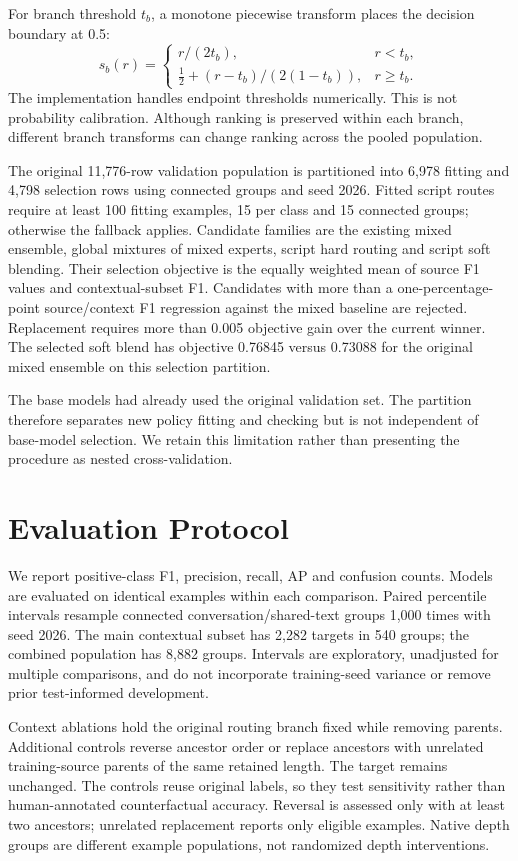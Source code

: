 \documentclass[11pt,a4paper]{article}
\begin{document}
For branch threshold $t_b$, a monotone piecewise transform places the decision boundary at 0.5:
\begin{equation}
s_b(r)=\begin{cases}r/(2t_b),&r<t_b,\\
\tfrac12+(r-t_b)/(2(1-t_b)),&r\geq t_b.
\end{cases}
\end{equation}
The implementation handles endpoint thresholds numerically. This is not probability calibration. Although ranking is preserved within each branch, different branch transforms can change ranking across the pooled population.

The original 11,776-row validation population is partitioned into 6,978 fitting and 4,798 selection rows using connected groups and seed 2026. Fitted script routes require at least 100 fitting examples, 15 per class and 15 connected groups; otherwise the fallback applies. Candidate families are the existing mixed ensemble, global mixtures of mixed experts, script hard routing and script soft blending. Their selection objective is the equally weighted mean of source F1 values and contextual-subset F1. Candidates with more than a one-percentage-point source/context F1 regression against the mixed baseline are rejected. Replacement requires more than 0.005 objective gain over the current winner. The selected soft blend has objective 0.76845 versus 0.73088 for the original mixed ensemble on this selection partition.

The base models had already used the original validation set. The partition therefore separates new policy fitting and checking but is not independent of base-model selection. We retain this limitation rather than presenting the procedure as nested cross-validation.

\section{Evaluation Protocol}
We report positive-class F1, precision, recall, AP and confusion counts. Models are evaluated on identical examples within each comparison. Paired percentile intervals resample connected conversation/shared-text groups 1,000 times with seed 2026. The main contextual subset has 2,282 targets in 540 groups; the combined population has 8,882 groups. Intervals are exploratory, unadjusted for multiple comparisons, and do not incorporate training-seed variance or remove prior test-informed development.

Context ablations hold the original routing branch fixed while removing parents. Additional controls reverse ancestor order or replace ancestors with unrelated training-source parents of the same retained length. The target remains unchanged. The controls reuse original labels, so they test sensitivity rather than human-annotated counterfactual accuracy. Reversal is assessed only with at least two ancestors; unrelated replacement reports only eligible examples. Native depth groups are different example populations, not randomized depth interventions.
\end{document}

